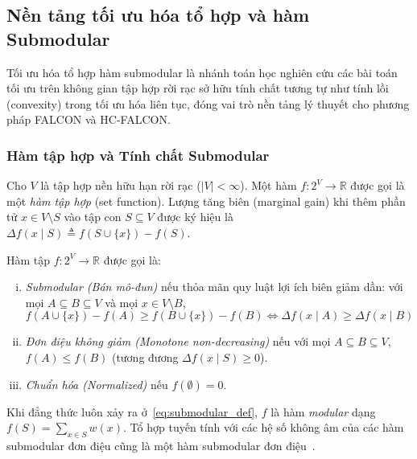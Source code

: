 \subsection{Nền tảng tối ưu hóa tổ hợp và hàm Submodular}
\label{subsec:submodular_optimization}

Tối ưu hóa tổ hợp hàm submodular là nhánh toán học nghiên cứu các bài toán tối ưu trên không gian tập hợp rời rạc sở hữu tính chất tương tự như tính lồi (convexity) trong tối ưu hóa liên tục, đóng vai trò nền tảng lý thuyết cho phương pháp FALCON và HC-FALCON.

\subsubsection{Hàm tập hợp và Tính chất Submodular}
\label{subsubsec:submodular_functions}

Cho $V$ là tập hợp nền hữu hạn rời rạc ($|V| < \infty$). Một hàm $f: 2^V \to \mathbb{R}$ được gọi là một \textit{hàm tập hợp} (set function). Lượng tăng biên (marginal gain) khi thêm phần tử $x \in V \setminus S$ vào tập con $S \subseteq V$ được ký hiệu là $\Delta f(x \mid S) \triangleq f(S \cup \{x\}) - f(S)$.

\begin{dn}
\label{def:submodularity}
Hàm tập $f: 2^V \to \mathbb{R}$ được gọi là:
\begin{enumerate}[(i)]
    \item \textit{Submodular (Bán mô-đun)} nếu thỏa mãn quy luật lợi ích biên giảm dần: với mọi $A \subseteq B \subseteq V$ và mọi $x \in V \setminus B$,
    \begin{equation}
    \label{eq:submodular_def}
    f(A \cup \{x\}) - f(A) \ge f(B \cup \{x\}) - f(B) \iff \Delta f(x \mid A) \ge \Delta f(x \mid B)
    \end{equation}
    \item \textit{Đơn điệu không giảm (Monotone non-decreasing)} nếu với mọi $A \subseteq B \subseteq V$, $f(A) \le f(B)$ (tương đương $\Delta f(x \mid S) \ge 0$).
    \item \textit{Chuẩn hóa (Normalized)} nếu $f(\emptyset) = 0$.
\end{enumerate}
\end{dn}

Khi đẳng thức luôn xảy ra ở~\eqref{eq:submodular_def}, $f$ là hàm \textit{modular} dạng $f(S) = \sum_{x \in S} w(x)$. Tổ hợp tuyến tính với các hệ số không âm của các hàm submodular đơn điệu cũng là một hàm submodular đơn điệu~\cite{krause2014submodular}.

